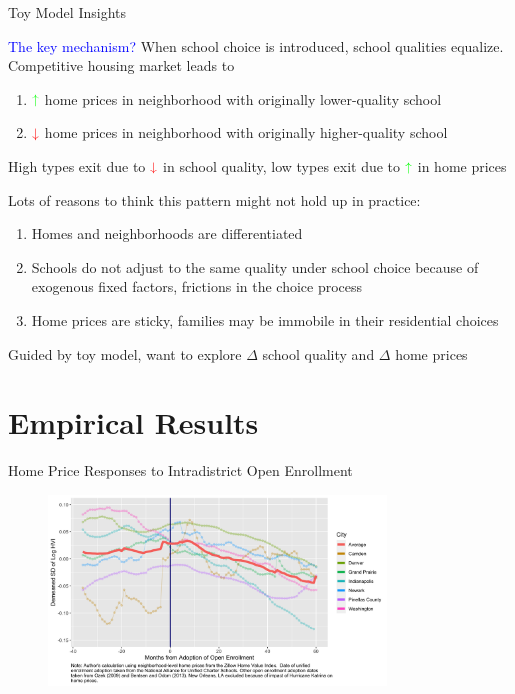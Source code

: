 \documentclass[notes,11pt, aspectratio=169]{beamer}
\newenvironment{wideitemize}{\itemize\addtolength{\itemsep}{10pt}}{\enditemize}
\begin{document}
\begin{frame}{Toy Model Insights}
\label{databack}
\begin{wideitemize}
\item \textcolor{blue}{The key mechanism?} When school choice is introduced, school qualities equalize. Competitive housing market leads to
\begin{enumerate}
\item $\textcolor{green}{\uparrow}$ home prices in neighborhood with originally lower-quality school
\item $\textcolor{red}{\downarrow}$ home prices in neighborhood with originally higher-quality school
\end{enumerate}
\item High types exit due to $\textcolor{red}{\downarrow}$ in school quality, low types exit due to $\textcolor{green}{\uparrow}$ in home prices
\item Lots of reasons to think this pattern might not hold up in practice:
\begin{enumerate}
    \item Homes and neighborhoods are differentiated
    \item Schools do not adjust to the same quality under school choice because of exogenous fixed factors, frictions in the choice process
    \item Home prices are sticky, families may be immobile in their residential choices
\end{enumerate} 
\item Guided by toy model, want to explore $\Delta$ school quality and $\Delta$ home prices \hyperlink{data}{}
\end{wideitemize}
\end{frame}

\section{Empirical Results}

\begin{frame}{Home Price Responses to Intradistrict Open Enrollment}
\label{giniback}
\begin{figure}
\centering
\includegraphics[width=0.8\textwidth]{figures/demeaned_hpi_sd_MONTHLY.png}
\end{figure}
\hyperlink{gini}{} \hyperlink{sumstats}{}
\end{frame}
\end{document}
